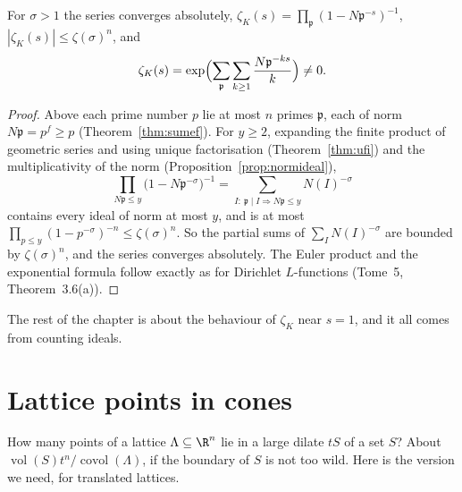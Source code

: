 \begin{proposition}\label{prop:zetaK}
For $\sigma>1$ the series converges absolutely, $\zeta_K(s)=\prod_{\mathfrak p}(1-N\mathfrak p^{-s})^{-1}$, $|\zeta_K(s)|\le\zeta(\sigma)^n$,
and
\[
\zeta_K(s)=\exp\Bigl(\sum_{\mathfrak p}\sum_{k\ge1}\frac{N\mathfrak p^{-ks}}k\Bigr)\ne0.
\]
\end{proposition}
\begin{proof}
Above each prime number $p$ lie at most $n$ primes $\mathfrak p$, each of norm $N\mathfrak p=p^{f}\ge p$ (Theorem~\ref{thm:sumef}).
For $y\ge2$, expanding the finite product of geometric series and using unique factorisation (Theorem~\ref{thm:ufi}) and the
multiplicativity of the norm (Proposition~\ref{prop:normideal}),
\[
\prod_{N\mathfrak p\le y}\bigl(1-N\mathfrak p^{-\sigma}\bigr)^{-1}=\sum_{I:\ \mathfrak p\mid I\Rightarrow N\mathfrak p\le y}N(I)^{-\sigma}
\]
contains every ideal of norm at most $y$, and is at most $\prod_{p\le y}(1-p^{-\sigma})^{-n}\le\zeta(\sigma)^n$. So the partial sums of
$\sum_IN(I)^{-\sigma}$ are bounded by $\zeta(\sigma)^n$, and the series converges absolutely. The Euler product and the exponential
formula follow exactly as for Dirichlet $L$-functions (Tome~5, Theorem~3.6(a)).
\end{proof}

The rest of the chapter is about the behaviour of $\zeta_K$ near $s=1$, and it all comes from counting ideals.

\section{Lattice points in cones}

How many points of a lattice $\Lambda\subseteq\R^n$ lie in a large dilate $tS$ of a set $S$? About $\operatorname{vol}(S)t^n/
\operatorname{covol}(\Lambda)$, if the boundary of $S$ is not too wild. Here is the version we need, for translated lattices.

